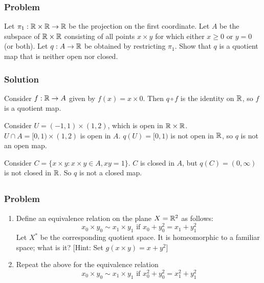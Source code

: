 \subsubsection{Problem}
Let $\pi_1 : \mathbb R \times \mathbb R \to \mathbb R$ be the projection on the first coordinate. Let $A$ be the subspace of $\mathbb R \times \mathbb R$ consisting of all points $x \times y$ for which either $x \geq 0$ or $y = 0$ (or both). Let $q : A \to \mathbb R$ be obtained by restricting $\pi_1$. Show that $q$ is a quotient map that is neither open nor closed.

\subsubsection{Solution}
Consider $f : \mathbb R \to A$ given by $f(x) = x \times 0$. Then $q \circ f$ is the identity on $\mathbb R$, so $f$ is a quotient map.

Consider $U = (-1, 1) \times (1,2)$, which is open in $\mathbb R \times \mathbb R$. $U \cap A = [0,1) \times (1,2)$ is open in $A$. $q(U) = [0,1)$ is not open in $\mathbb R$, so $q$ is not an open map.

Consider $C = \{ x \times y : x \times y \in A, xy=1\}$. $C$ is closed in $A$, but $q(C) = (0, \infty)$ is not closed in $\mathbb R$. So $q$ is not a closed map.


\setcounter{subsection}{3} %
\subsection{}

\subsubsection{Problem}
\begin{enumerate}
\item Define an equivalence relation on the plane $X = \mathbb R^2$ as follows:
\[x_0 \times y_0 \sim x_1 \times y_1 \textrm{ if } x_0 + y_0^2 = x_1 + y_1^2\]
Let $X^*$ be the corresponding quotient space. It is homeomorphic to a familiar space; what is it? [Hint: Set $g(x \times y) = x + y^2$]
\item Repeat the above for the equivalence relation
\[x_0 \times y_0 \sim x_1 \times y_1 \textrm{ if } x_0^2 + y_0^2 = x_1^2 + y_1^2\]
\end{enumerate}


